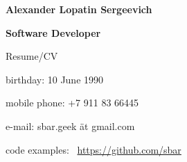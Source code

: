 \begin{center}
\fontsize{16pt}{12pt}\selectfont
\bfseries Alexander Lopatin Sergeevich\mdseries

\fontsize{12pt}{12pt}\selectfont
\bfseries Software Developer\mdseries

Resume/CV
\end{center}
{
\fontsize{11pt}{8pt}\selectfont
\begin{center}
\item birthday: 10 June 1990
\item mobile phone: +7 911 83 66445
\item e-mail: sbar.geek ät gmail.com
\item code examples: \
\href{https://github.com/sbar?tab=repositories}{https://github.com/sbar}
\end{center}
}

